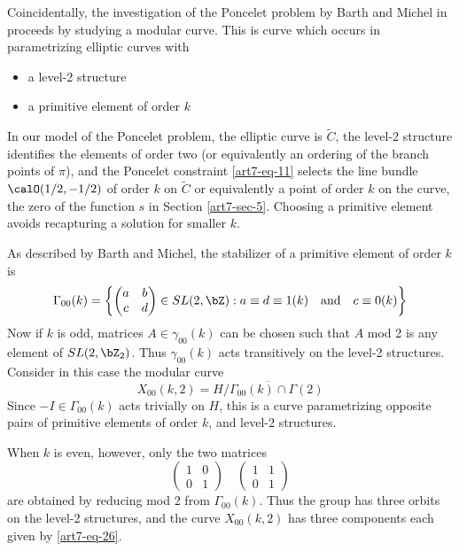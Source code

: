 Coincidentally, the investigation of the Poncelet problem by Barth and Michel in \cite{art7-key1} proceeds by studying a modular curve. This is curve which occurs in parametrizing elliptic curves with     
\begin{itemize}
\item a level-2 structure

\item a primitive element of order $k$
\end{itemize}
In our model of the Poncelet problem, the elliptic curve is $\tilde{C}$, the level-2
structure identifies the elements of order two (or equivalently an ordering of the branch points of $\pi$), and the Poncelet constraint \eqref{art7-eq-11} selects the line bundle $\calO(1/2,-1/2)$ of order $k$ on $\tilde{C}$ or equivalently a point of order $k$ on the curve, the zero of the function $s$ in Section \ref{art7-sec-5}. Choosing a primitive element avoids recapturing a solution for smaller $k$.

As described by Barth and Michel, the stabilizer of a primitive element of order $k$ is
\begin{equation}\label{art7-eq-25}
\Gamma_{00}(k) = \left\{\begin{pmatrix}
a & b\\
c & d
\end{pmatrix}
\in SL(2, \bZ) : a \equiv d \equiv 1(k)\quad  \text{and}\quad c\equiv 0(k)\right\}
\end{equation}
Now if $k$ is odd, matrices $A\in \gamma_{00}(k)$ can be chosen such that $A$ mod 2 is any element of $SL(2,\bZ_{2})$. Thus $\gamma_{00}(k)$ acts transitively on the level-2 structures. Consider in this case the modular curve
\begin{equation}\label{art7-eq-26}
X_{00}(k,2) = \overline{H/\Gamma_{00}(k)\cap \Gamma(2)}
\end{equation}
Since $-I \in \Gamma_{00}(k)$ acts trivially on $H$, this is a curve parametrizing opposite pairs of primitive elements of order $k$, and level-2 structures.

When $k$ is even, however, only the two matrices
$$
\begin{pmatrix}
 1 & 0\\
 0 & 1
\end{pmatrix}
\quad 
\begin{pmatrix}
 1 & 1\\
 0 & 1
\end{pmatrix}
$$
are obtained by reducing mod 2 from $\Gamma_{00}(k)$. Thus the group has three orbits on the level-2 structures, and the curve $X_{00}(k,2)$ has three components each given by \eqref{art7-eq-26}.

